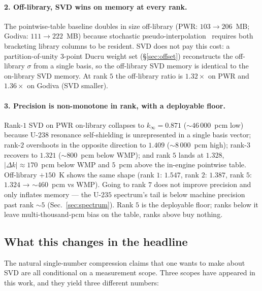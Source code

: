 \paragraph{2. Off-library, SVD wins on memory at every rank.}
The pointwise-table baseline doubles in size off-library
(PWR: $103 \to 206$~MB; Godiva: $111 \to 222$~MB) because
stochastic pseudo-interpolation~\cite{romano2015openmc} requires
both bracketing library columns to be resident. SVD does not
pay this cost: a partition-of-unity 3-point Ducru weight set
(\S\ref{sec:offset}) reconstructs the off-library $\sigma$ from
a single basis, so the off-library SVD memory is identical to
the on-library SVD memory. At rank $5$ the off-library ratio
is $1.32\times$ on PWR and $1.36\times$ on Godiva (SVD smaller).

\paragraph{3. Precision is non-monotone in rank, with a deployable floor.}
Rank-$1$ SVD on PWR on-library collapses to $k_\infty = 0.871$
($\sim\!46\,000$~pcm low) because U-$238$ resonance
self-shielding is unrepresented in a single basis vector;
rank-$2$ overshoots in the opposite direction to $1.409$
($\sim\!8\,000$~pcm high); rank-$3$ recovers to $1.321$ ($\sim\!800$~pcm
below WMP); and rank $5$ lands at $1.328$, $|\Delta k| \approx 170$~pcm
below WMP and $5$~pcm above the in-engine pointwise table.
Off-library $+150$~K shows the same shape (rank $1$: $1.547$,
rank $2$: $1.387$, rank $5$: $1.324$ → $\sim\!460$~pcm vs WMP).
Going to rank $7$ does not improve precision and only inflates
memory --- the U-$235$ spectrum's tail is below machine
precision past rank $\sim\!5$ (Sec.~\ref{sec:spectrum}).
Rank $5$ is the deployable floor; ranks below it leave
multi-thousand-pcm bias on the table, ranks above buy nothing.

\subsection{What this changes in the headline}

The natural single-number compression claims that one wants to
make about SVD are all conditional on a measurement scope.
Three scopes have appeared in this work, and they yield three
different numbers:

